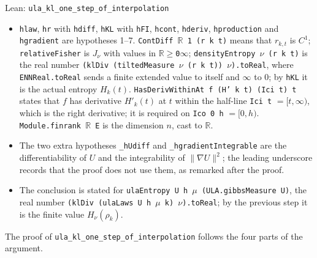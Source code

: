 \documentclass[11pt,a4paper]{report}
\begin{document}
\begin{leanbox}{Lean: \texttt{ula\_\allowbreak{}kl\_\allowbreak{}one\_\allowbreak{}step\_\allowbreak{}of\_\allowbreak{}interpolation}}
\begin{itemize}
\item \texttt{hlaw}, \texttt{hr} with \texttt{hdiff}, \texttt{h\allowbreak{}KL} with \texttt{h\allowbreak{}FI}, \texttt{hcont}, \texttt{hderiv}, \texttt{hproduction} and \texttt{hgradient} are hypotheses 1–7. \texttt{Cont\allowbreak{}Diff \ensuremath{\mathbb R} 1 (r k t)} means that \(r_{k,t}\) is \(C^1\); \texttt{relative\allowbreak{}Fisher} is \(J_\nu\) with values in \texttt{\ensuremath{\mathbb R}\ensuremath{\ge}0\ensuremath{\infty}}; \texttt{density\allowbreak{}Entropy \ensuremath{\nu} (r k t)} is the real number \texttt{(kl\allowbreak{}Div (tilted\allowbreak{}Measure \ensuremath{\nu} (r k t)) \ensuremath{\nu}).\allowbreak{}to\allowbreak{}Real}, where \texttt{ENNReal.\allowbreak{}to\allowbreak{}Real} sends a finite extended value to itself and \(\infty\) to \(0\); by \texttt{h\allowbreak{}KL} it is the actual entropy \(H_k(t)\). \texttt{Has\allowbreak{}Deriv\allowbreak{}Within\allowbreak{}At f (H' k t) (Ici t) t} states that \(f\) has derivative \(H'_k(t)\) at \(t\) within the half-line \texttt{Ici t} \(=[t,\infty)\), which is the right derivative; it is required on \texttt{Ico 0 h} \(=[0,h)\). \texttt{Module.\allowbreak{}finrank \ensuremath{\mathbb R} E} is the dimension \(n\), cast to \(\mathbb R\).

\item The two extra hypotheses \texttt{\_\allowbreak{}h\allowbreak{}Udiff} and \texttt{\_\allowbreak{}hgradient\allowbreak{}Integrable} are the differentiability of \(U\) and the integrability of \(\|\nabla U\|^2\); the leading underscore records that the proof does not use them, as remarked after the proof.

\item The conclusion is stated for \texttt{ula\allowbreak{}Entropy U h \ensuremath{\mu} (ULA.\allowbreak{}gibbs\allowbreak{}Measure U)}, the real number \texttt{(kl\allowbreak{}Div (ula\allowbreak{}Laws U h \ensuremath{\mu} k) \ensuremath{\nu}).\allowbreak{}to\allowbreak{}Real}; by the previous step it is the finite value \(H_\nu(\rho_k)\).

\end{itemize}



The proof of \texttt{ula\_\allowbreak{}kl\_\allowbreak{}one\_\allowbreak{}step\_\allowbreak{}of\_\allowbreak{}interpolation} follows the four parts of the argument.



\begin{enumerate}



\end{enumerate}
\end{leanbox}
\end{document}
